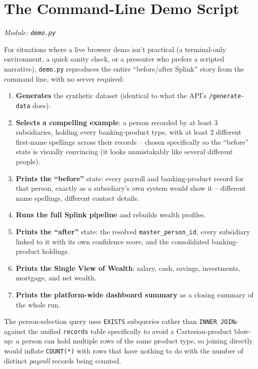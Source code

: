 \documentclass[11pt]{report}
\newcommand{\code}[1]{\lstinline[style=plain]!#1!}
\begin{document}
\chapter{The Command-Line Demo Script}
\label{ch:demo}

\textit{Module: \texttt{demo.py}}

For situations where a live browser demo isn't practical (a terminal-only environment, a quick sanity check, or a presenter who prefers a scripted narrative), \texttt{demo.py} reproduces the entire ``before/after Splink'' story from the command line, with no server required:

\begin{enumerate}
\item \textbf{Generates} the synthetic dataset (identical to what the API's \code{/generate-data} does).
\item \textbf{Selects a compelling example}: a person recorded by at least 3 subsidiaries, holding every banking-product type, with at least 2 different first-name spellings across their records -- chosen specifically so the ``before'' state is visually convincing (it looks unmistakably like several different people).
\item \textbf{Prints the ``before''} state: every payroll and banking-product record for that person, exactly as a subsidiary's own system would show it -- different name spellings, different contact details.
\item \textbf{Runs the full Splink pipeline} and rebuilds wealth profiles.
\item \textbf{Prints the ``after''} state: the resolved \code{master_person_id}, every subsidiary linked to it with its own confidence score, and the consolidated banking-product holdings.
\item \textbf{Prints the Single View of Wealth}: salary, cash, savings, investments, mortgage, and net wealth.
\item \textbf{Prints the platform-wide dashboard summary} as a closing summary of the whole run.
\end{enumerate}

\begin{engbox}
The person-selection query uses \code{EXISTS} subqueries rather than \code{INNER JOIN}s against the unified \code{records} table specifically to avoid a Cartesian-product blow-up: a person can hold multiple rows of the same product type, so joining directly would inflate \code{COUNT(*)} with rows that have nothing to do with the number of distinct \emph{payroll} records being counted.
\end{engbox}
\end{document}
